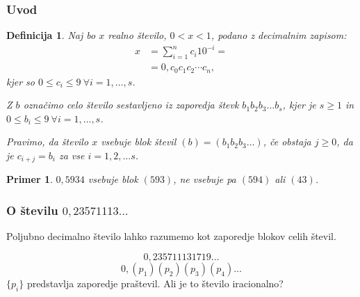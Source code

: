 \documentclass{beamer}
\newtheorem{definicija}{Definicija}
\newtheorem{primer}{Primer}
\begin{document}
\begin{frame}
    \frametitle{Uvod}
    \begin{definicija}
        Naj bo $x$ realno število, $ 0 < x < 1$, podano z decimalnim zapisom: 
        \[ 
            \begin{split}
                x & = \sum^n_{i=1} c_i 10^{-i} = \\
                & = 0,c_0c_1c_2 \cdots c_n ,
            \end{split}   
        \]
        kjer so $0 \leq c_i \leq 9 \ \forall i = 1, \dots, s$.
        
        Z $b$ označimo celo število sestavljeno iz zaporedja števk
        $b_1b_2b_3 \dots b_s$, 
        kjer je $s\geq 1$ in $0 \leq b_i \leq 9 \ \forall i = 1, \dots, s$.

        Pravimo, da število $x$ \alert{vsebuje blok števil} $(b) = (b_1b_2b_3 \dots)$, če obstaja $j \geq 0$, da je 
        $c_{i+j} = b_i$ za vse $i=1, 2, \dots s$. 
    \end{definicija}


    \pause
    \begin{primer}
        $0,5934$ vsebuje blok $(593)$, ne vsebuje pa $(594)$ ali $(43)$.
    \end{primer} 


\end{frame}

\begin{frame}
    \frametitle{O številu $0,23571113\dots$}
    Poljubno decimalno število lahko razumemo kot zaporedje blokov celih števil.

    \pause
    \[0,235711131719\dots\]
    \pause
    \[0,(p_1)(p_2)(p_3)(p_4)\dots\]
    $\{p_i\}$ predstavlja zaporedje praštevil.
    \pause
    \newline
    \newline
    Ali je to število iracionalno?


\end{frame}
\end{document}
